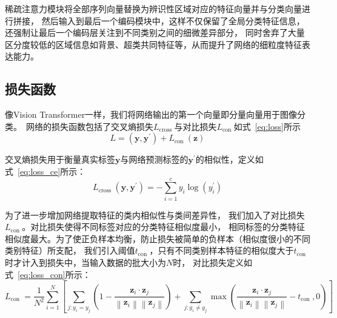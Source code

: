 稀疏注意力模块将全部序列向量替换为辨识性区域对应的特征向量并与分类向量进行拼接，
然后输入到最后一个编码模块中，这样不仅保留了全局分类特征信息，还强制让最后一个编码层关注到不同类别之间的细微差异部分，
同时舍弃了大量区分度较低的区域信息如背景、超类共同特征等，从而提升了网络的细粒度特征表达能力。

\subsection{损失函数}
像Vision Transformer一样，我们将网络输出的第一个向量即分量向量用于图像分类。\
网络的损失函数包括了交叉熵损失$L_{\text {cross }}$与对比损失$L_{\text {con }}$如式~\ref{eq:loss}所示
\begin{equation}
  L=\left(\boldsymbol{y}, \boldsymbol{y}^{\prime}\right)+L_{\text {con }}(\mathbf{z})
  \label{eq:loss}
\end{equation}

交叉熵损失用于衡量真实标签$\boldsymbol{y}$与网络预测标签的$\boldsymbol{y}^{\prime}$的相似性，定义如式~\ref{eq:loss_ce}所示：
\begin{equation}
  L_{\text {cross }}\left(\boldsymbol{y}, \boldsymbol{y}^{\prime}\right)=-\sum_{i=1}^{c} y_{i} \log \left(y_{i}^{\prime}\right)
  \label{eq:loss_ce}
\end{equation}

为了进一步增加网络提取特征的类内相似性与类间差异性，
我们加入了对比损失$L_{\text {con }}$\cite{hadsell2006dimensionality}。对比损失使得不同标签对应的分类特征相似度最小，
相同标签的分类特征相似度最大。为了使正负样本均衡，防止损失被简单的负样本（相似度很小的不同类别特征）所支配，
我们引入阈值$t_{\text {con }}$，只有不同类别样本特征的相似度大于$t_{\text {con }}$时才计入到损失中，当输入数据的批大小为$N$时，
对比损失定义如式~\ref{eq:loss_con}所示：
\begin{equation}
  L_{\text {con }}=\frac{1}{N^{2}} \sum_{i=1}^{N}\left[\sum_{j: y_{i}=y_{j}}\left(1-\frac{\mathbf{z}_{i} \cdot \mathbf{z}_{j}}{\left\|\mathbf{z}_{i}\right\|\left\|\mathbf{z}_{j}\right\|}\right)+\sum_{j: y_{i} \neq y_{j}} \max \left(\frac{\mathbf{z}_{i} \cdot \mathbf{z}_{j}}{\left\|\mathbf{z}_{i}\right\|\left\|\mathbf{z}_{j}\right\|}-t_{\text {con }}, 0\right)\right]
  \label{eq:loss_con}
\end{equation}




